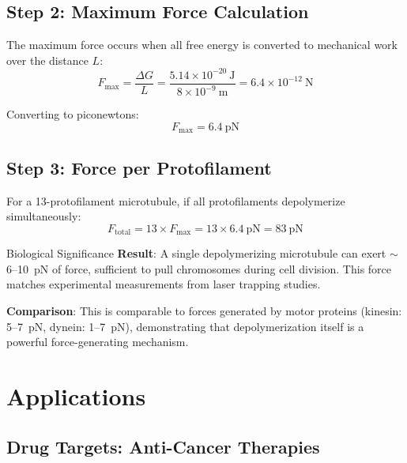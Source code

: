 \subsection*{Step 2: Maximum Force Calculation}

The maximum force occurs when all free energy is converted to mechanical work over the distance $L$:
\begin{equation}
F_{\text{max}} = \frac{\Delta G}{L} = \frac{5.14 \times 10^{-20}~\text{J}}{8 \times 10^{-9}~\text{m}} = 6.4 \times 10^{-12}~\text{N}
\label{eq:force-max}
\end{equation}

Converting to piconewtons:
\begin{equation}
F_{\text{max}} = 6.4~\text{pN}
\label{eq:force-pn}
\end{equation}

\subsection*{Step 3: Force per Protofilament}

For a 13-protofilament microtubule, if all protofilaments depolymerize simultaneously:
\begin{equation}
F_{\text{total}} = 13 \times F_{\text{max}} = 13 \times 6.4~\text{pN} = 83~\text{pN}
\label{eq:total-force}
\end{equation}

\begin{calloutbox}{Biological Significance}
\textbf{Result}: A single depolymerizing microtubule can exert $\sim$6--10~pN of force, sufficient to pull chromosomes during cell division. This force matches experimental measurements from laser trapping studies.

\textbf{Comparison}: This is comparable to forces generated by motor proteins (kinesin: 5--7~pN, dynein: 1--7~pN), demonstrating that depolymerization itself is a powerful force-generating mechanism.
\end{calloutbox}

\section{Applications}
\label{sec:applications}

\subsection{Drug Targets: Anti-Cancer Therapies}
\label{subsec:cancer-drugs}

